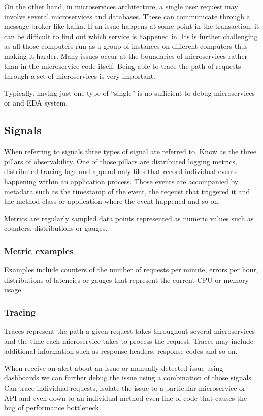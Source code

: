 \documentclass[a4paper, 11pt]{book}
\begin{document}
    On the other hand, in microservices architecture, a single user request may involve several microservices and databases.
    These can communicate through a message broker like kafka.
    If an issue happens at some point in the transaction, it can be difficult to find out which service is happened in.
    Its is further challenging as all those computers run as a group of instances on different computers thus making it harder.
    Many issues occur at the boundaries of microservices rather than in the microservice code itself.
    Being able to trace the path of requests through a set of microservices is very important.

    Typically, having just one type of ``single'' is no sufficient to debug microservices or and EDA system.

    \subsection{Signals}
    When referring to signals three types of signal are referred to.
    Know as the three pillars of observability.
    One of those pillars are distributed logging metrics, distributed tracing logs and append only files that record individual events happening within an application process.
    Those events are accompanied by metadata such as the timestamp of the event, the reqeust that triggered it and the method class or application where the event happened and so on.

    Metrics are regularly sampled data points represented as numeric values such as counters, distributions or gauges.

    \subsubsection{Metric examples}
    Examples include counters of the number of requests per minute, errors per hour, distributions of latencies or gauges that represent the current CPU or memory usage.

    \subsubsection{Tracing}
    Traces represent the path a given request takes throughout several microservices and the time each microservice takes to process the request.
    Traces may include additional information such as response headers, response codes and so on.

    When receive an alert about an issue or manually detected issue using dashboards we can further debug the issue using a combination of those signals.
    Can trace individual requests, isolate the issue to a particular microservice or API and even down to an individual method even line of code that causes the bug of performance bottleneck.
\end{document}

